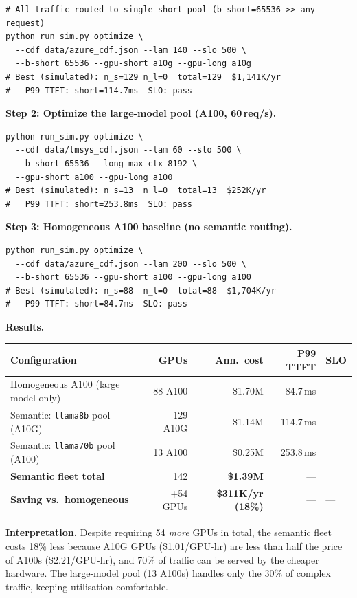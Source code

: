 \documentclass[11pt,a4paper]{article}
\begin{document}
\begin{lstlisting}[style=shell]
# All traffic routed to single short pool (b_short=65536 >> any request)
python run_sim.py optimize \
  --cdf data/azure_cdf.json --lam 140 --slo 500 \
  --b-short 65536 --gpu-short a10g --gpu-long a10g
# Best (simulated): n_s=129 n_l=0  total=129  $1,141K/yr
#   P99 TTFT: short=114.7ms  SLO: pass
\end{lstlisting}

\textbf{Step 2: Optimize the large-model pool (A100, 60\,req/s).}

\begin{lstlisting}[style=shell]
python run_sim.py optimize \
  --cdf data/lmsys_cdf.json --lam 60 --slo 500 \
  --b-short 65536 --long-max-ctx 8192 \
  --gpu-short a100 --gpu-long a100
# Best (simulated): n_s=13  n_l=0  total=13  $252K/yr
#   P99 TTFT: short=253.8ms  SLO: pass
\end{lstlisting}

\textbf{Step 3: Homogeneous A100 baseline (no semantic routing).}

\begin{lstlisting}[style=shell]
python run_sim.py optimize \
  --cdf data/azure_cdf.json --lam 200 --slo 500 \
  --b-short 65536 --gpu-short a100 --gpu-long a100
# Best (simulated): n_s=88  n_l=0  total=88  $1,704K/yr
#   P99 TTFT: short=84.7ms  SLO: pass
\end{lstlisting}

\textbf{Results.}
\begin{center}
\begin{tabular}{lrrrl}
\toprule
Configuration & GPUs & Ann.\ cost & P99 TTFT & SLO \\
\midrule
Homogeneous A100 (large model only) & 88 A100 & \$1.70M & 84.7\,ms & \checkmark \\
Semantic: \texttt{llama8b} pool (A10G) & 129 A10G & \$1.14M & 114.7\,ms & \checkmark \\
Semantic: \texttt{llama70b} pool (A100) & 13 A100 & \$0.25M & 253.8\,ms & \checkmark \\
\midrule
\textbf{Semantic fleet total} & 142 & \textbf{\$1.39M} & --- & \checkmark \\
\textbf{Saving vs.\ homogeneous} & +54 GPUs & \textbf{\$311K/yr (18\%)} & --- & --- \\
\bottomrule
\end{tabular}
\end{center}

\textbf{Interpretation.}  Despite requiring 54 \emph{more} GPUs in total,
the semantic fleet costs 18\% less because A10G GPUs (\$1.01/GPU-hr) are
less than half the price of A100s (\$2.21/GPU-hr), and 70\% of traffic can
be served by the cheaper hardware.  The large-model pool (13 A100s) handles
only the 30\% of complex traffic, keeping utilisation comfortable.
\end{document}
